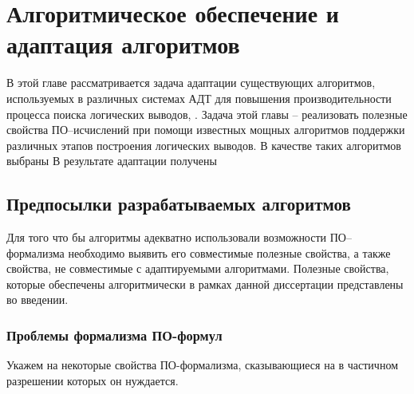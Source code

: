 \chapter{Алгоритмическое обеспечение и адаптация алгоритмов}

В этой главе рассматривается задача адаптации существующих алгоритмов, используемых в различных системах АДТ для повышения производительности процесса поиска логических выводов, . Задача этой главы -- реализовать полезные свойства ПО--исчислений при помощи известных мощных алгоритмов поддержки различных этапов построения логических выводов. В качестве таких алгоритмов выбраны  В результате адаптации получены 

\section{Предпосылки разрабатываемых алгоритмов}

Для того что бы алгоритмы адекватно использовали возможности ПО--формализма необходимо выявить его совместимые полезные свойства, а также свойства, не совместимые с адаптируемыми алгоритмами.  Полезные свойства, которые обеспечены алгоритмически в рамках данной диссертации представлены во введении.

\subsection{Проблемы формализма ПО-формул}
Укажем на некоторые свойства ПО-формализма, сказывающиеся на  в частичном разрешении которых он нуждается.

